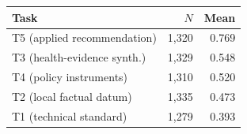 \begin{tabular}{lrr}
\toprule
Task & $N$ & Mean \\
\midrule
T5 (applied recommendation)    & 1{,}320 & 0.769 \\
T3 (health-evidence synth.)    & 1{,}329 & 0.548 \\
T4 (policy instruments)        & 1{,}310 & 0.520 \\
T2 (local factual datum)       & 1{,}335 & 0.473 \\
T1 (technical standard)        & 1{,}279 & 0.393 \\
\bottomrule
\end{tabular}
